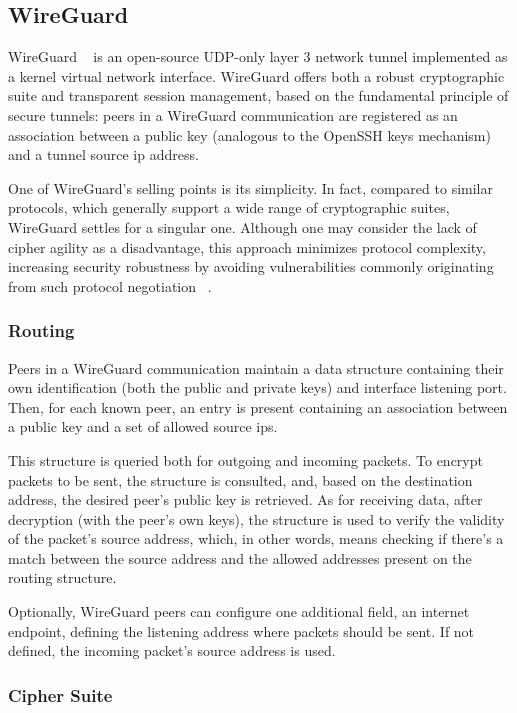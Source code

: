\documentclass[11pt,twoside,a4paper]{report}
\begin{document}
\subsection{WireGuard}

WireGuard ~\cite{donenfeld2017wireguard} is an open-source UDP-only layer 3 network tunnel implemented as a kernel virtual network interface. WireGuard offers both a robust cryptographic suite and transparent session management, based on the fundamental principle of secure tunnels: peers in a WireGuard communication are registered as an association between a public key (analogous to the OpenSSH keys mechanism) and a tunnel source \ac{ip} address.

One of WireGuard's selling points is its simplicity. In fact, compared to similar protocols, which generally support a wide range of cryptographic suites, WireGuard settles for a singular one. Although one may consider the lack of cipher agility as a disadvantage, this approach minimizes protocol complexity, increasing security robustness by avoiding vulnerabilities commonly originating from such protocol negotiation ~\cite{curguz2016vulnerabilities}.

\subsubsection{Routing}

Peers in a WireGuard communication maintain a data structure containing their own identification (both the public and private keys) and interface listening port. Then, for each known peer, an entry is present containing an association between a public key and a set of allowed source \ac{ip}s.

This structure is queried both for outgoing and incoming packets. To encrypt packets to be sent, the structure is consulted, and, based on the destination address, the desired peer's public key is retrieved. As for receiving data, after decryption (with the peer's own keys), the structure is used to verify the validity of the packet's source address, which, in other words, means checking if there's a match between the source address and the allowed addresses present on the routing structure.

Optionally, WireGuard peers can configure one additional field, an internet endpoint, defining the listening address where packets should be sent. If not defined, the incoming packet's source address is used.

\subsubsection{Cipher Suite}
\end{document}
